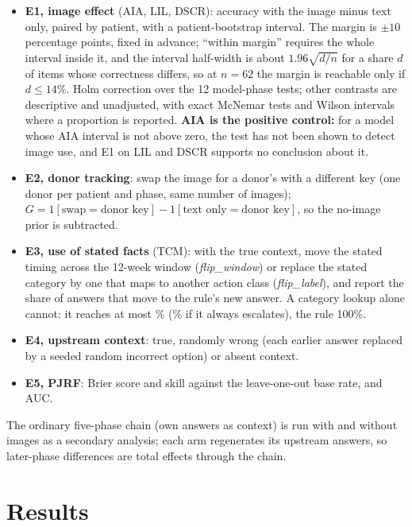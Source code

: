 \documentclass[11pt]{article}
\begin{document}
\begin{itemize}[leftmargin=*, itemsep=1pt, topsep=2pt]
    \item \textbf{E1, image effect} (AIA, LIL, DSCR): accuracy with the image minus text only, paired by patient, with a patient-bootstrap interval. The margin is $\pm10$ percentage points, fixed in advance; ``within margin'' requires the whole interval inside it, and the interval half-width is about $1.96\sqrt{d/n}$ for a share $d$ of items whose correctness differs, so at $n=62$ the margin is reachable only if $d\le14\%$. Holm correction over the 12 model-phase tests; other contrasts are descriptive and unadjusted, with exact McNemar tests \citep{mcnemar1947note} and Wilson intervals \citep{wilson1927probable} where a proportion is reported. \textbf{AIA is the positive control:} for a model whose AIA interval is not above zero, the test has not been shown to detect image use, and E1 on LIL and DSCR supports no conclusion about it.
    \item \textbf{E2, donor tracking}: swap the image for a donor's with a different key (one donor per patient and phase, same number of images); $G=1[\text{swap}=\text{donor key}]-1[\text{text only}=\text{donor key}]$, so the no-image prior is subtracted.
    \item \textbf{E3, use of stated facts} (TCM): with the true context, move the stated timing across the 12-week window (\emph{flip\_window}) or replace the stated category by one that maps to another action class (\emph{flip\_label}), and report the share of answers that move to the rule's new answer. A category lookup alone cannot: it reaches at most \vfourTcmLookupConf{}\% (\vfourTcmLookupEsc{}\% if it always escalates), the rule 100\%.
    \item \textbf{E4, upstream context}: true, randomly wrong (each earlier answer replaced by a seeded random incorrect option) or absent context.
    \item \textbf{E5, PJRF}: Brier score and skill against the leave-one-out base rate, and AUC.
\end{itemize}

The ordinary five-phase chain (own answers as context) is run with and without images as a secondary analysis; each arm regenerates its upstream answers, so later-phase differences are total effects through the chain.

\section{Results}
\label{sec:results}
\end{document}
